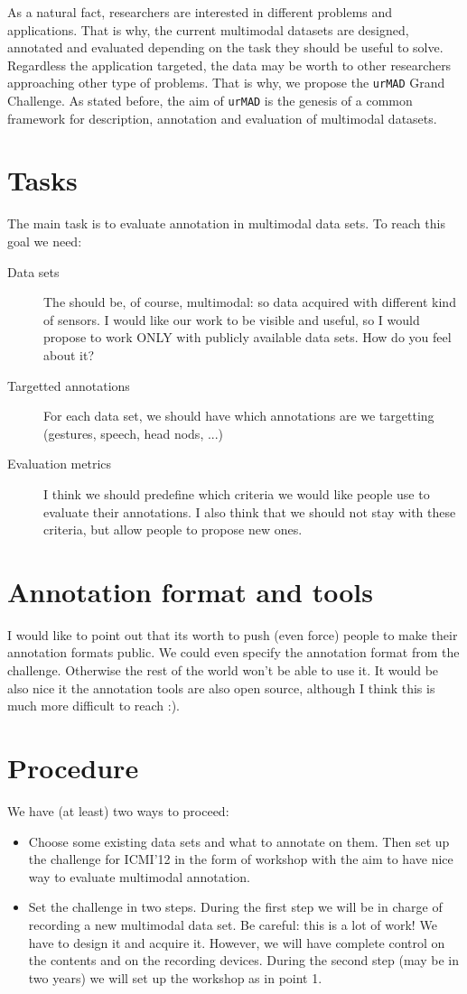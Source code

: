 \documentclass{article}
\begin{document}
As a natural fact, researchers are interested in different problems and applications. That is why, the current
multimodal datasets are designed, annotated and evaluated depending on the task they should be useful to solve.
Regardless the application targeted, the data may be worth to other researchers approaching other type of problems.
That is why, we propose the \texttt{urMAD} Grand Challenge. As stated before, the aim of \texttt{urMAD} is the genesis
of a common framework for description, annotation and evaluation of multimodal datasets.

 \section{Tasks}
The main task is to evaluate annotation in multimodal data sets. To reach this goal we need:
\begin{description}
 \item [Data sets] The should be, of course, multimodal: so data acquired with different kind of sensors. I would like
our work to be visible and useful, so I would propose to work ONLY with publicly available data sets. How do you feel
about it?
 \item [Targetted annotations] For each data set, we should have which annotations are we targetting (gestures, speech,
head nods, ...)
 \item [Evaluation metrics] I think we should predefine which criteria we would like people use to evaluate their
annotations. I also think that we should not stay with these criteria, but allow people to propose new ones.
\end{description}

 \section{Annotation format and tools}
I would like to point out that its worth to push (even force) people to make their annotation formats public. We could
even specify the annotation format from the challenge. Otherwise the rest of the world won't be able to use it. It would
be also nice it the annotation tools are also open source, although I think this is much more difficult to reach :).

 \section{Procedure}
We have (at least) two ways to proceed:
\begin{itemize}
 \item Choose some existing data sets and what to annotate on them. Then set up the challenge for ICMI'12 in the form
of workshop with the aim to have nice way to evaluate multimodal annotation.
 \item Set the challenge in two steps. During the first step we will be in charge of recording a new multimodal data
set. Be careful: this is a lot of work! We have to design it and acquire it. However, we will have complete control on
the contents and on the recording devices. During the second step (may be in two years) we will set up the workshop as
in point 1.
\end{itemize}
\end{document}

